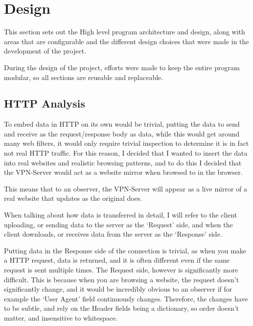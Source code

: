 \section{Design}
This section sets out the High level program architecture and design, along with areas that are configurable and the different design choices that were made in the development of the project.

During the design of the project, efforts were made to keep the entire program modular, so all sections are reusable and replaceable.
\subsection{HTTP Analysis}
To embed data in HTTP on its own would be trivial, putting the data to send and receive as the request/response body as data, while this would get around many web filters, it would only require trivial inspection to determine it is in fact not real HTTP traffic.
For this reason, I decided that I wanted to insert the data into real websites and realistic browsing patterns, and to do this I decided that the VPN-Server would act as a website mirror when browsed to in the browser.

This means that to an observer, the VPN-Server will appear as a live mirror of a real website that updates as the original does.

When talking about how data is transferred in detail, I will refer to the client uploading, or sending data to the server as the `Request' side, and when the client downloads, or receives data from the server as the `Response' side.

Putting data in the Response side of the connection is trivial, as when you make a HTTP request, data is returned, and it is often different even if the same request is sent multiple times.
The Request side, however is significantly more difficult. This is because when you are browsing a website, the request doesn't significantly change, and it would be incredibly obvious to an observer if for example the `User Agent' field continuously changes. Therefore, the changes have to be subtle, and rely on the Header fields being a dictionary, so order doesn't matter, and insensitive to whitespace.


